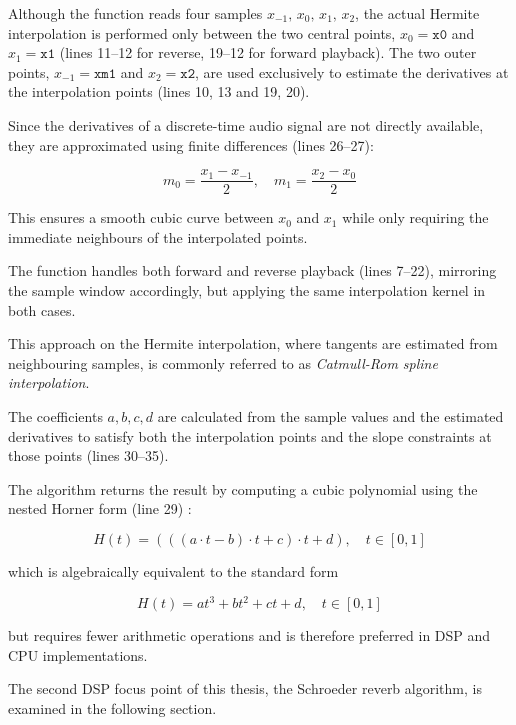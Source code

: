 Although the function reads four samples $x_{-1},\, x_0,\, x_1,\, x_2$,
the actual Hermite interpolation is performed only between the two central points,
$x_0 = \texttt{x0}$ and $x_1 = \texttt{x1}$ (lines 11--12 for reverse, 19--12 for forward playback).
The two outer points, $x_{-1} = \texttt{xm1}$ and $x_2 = \texttt{x2}$,
are used exclusively to estimate the derivatives at the interpolation points (lines 10, 13 and 19, 20).

Since the derivatives of a discrete-time audio signal are not directly available, 
they are approximated using finite differences (lines 26--27):

\begin{equation}
m_0 = \frac{x_1 - x_{-1}}{2}, \quad
m_1 = \frac{x_2 - x_0}{2}
\end{equation}

This ensures a smooth cubic curve between \(x_0\) and \(x_1\) while only requiring the immediate neighbours of the interpolated points.

The function handles both forward and reverse playback (lines 7--22),  mirroring the sample window accordingly, but applying the same interpolation kernel in both cases.

This approach on the Hermite interpolation, where tangents are estimated from neighbouring samples, is commonly referred to as \textit{Catmull-Rom spline interpolation}. \cite[p.11]{olliniemitaloPolynomialInterpolatorsHighQuality2001}

The coefficients $a,b,c,d$ are calculated from the sample values and the estimated derivatives to satisfy both the interpolation points and the slope constraints at those points (lines 30--35).

The algorithm returns the result by computing a cubic polynomial using the nested Horner form (line 29) \cite{burrusHornersMethodEvaluating}:

\begin{equation}
H(t) = (((a \cdot t - b) \cdot t + c) \cdot t + d), \quad t \in [0,1]
\end{equation}

which is algebraically equivalent to the standard form

\begin{equation}
H(t) = at^3 + bt^2 +ct +d, \quad t \in [0,1]
\end{equation}

but requires fewer arithmetic operations and is therefore preferred in DSP and CPU implementations.

The second DSP focus point of this thesis, the Schroeder reverb algorithm, is examined in the following section.